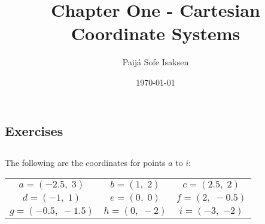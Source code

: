 \documentclass[12pt, a4paper]{article}
\title{Chapter One - Cartesian Coordinate Systems}
\author{Paijá Sofe Isaksen}
\date{\today}
\begin{document}
\maketitle

\begin{center}
	\section*{Exercises}
\end{center}

\subsection{}
The following are the coordinates for points $a$ to $i$:\\

\begin{tabular}{ c c c }
 	$a=\left(-2.5,\;3\right)$ & $b=\left(1,\;2\right)$ &
	$c=\left(2.5,\;2\right)$ \\ $d=\left(-1,\;1\right)$ &
	$e=\left(0,\;0\right)$ & $f=\left(2,\;-0.5\right)$ \\
	$g=\left(-0.5,\;-1.5\right)$ & $h=\left(0,\;-2\right)$ &
	$i=\left(\num{-3},\;{-2}\right)$
\end{tabular}
\end{document}
